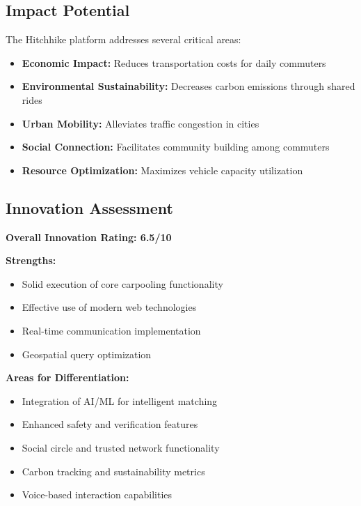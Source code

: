 \documentclass[12pt,a4paper]{article}
\begin{document}
\subsection{Impact Potential}

The Hitchhike platform addresses several critical areas:

\begin{itemize}
    \item \textbf{Economic Impact:} Reduces transportation costs for daily commuters
    \item \textbf{Environmental Sustainability:} Decreases carbon emissions through shared rides
    \item \textbf{Urban Mobility:} Alleviates traffic congestion in cities
    \item \textbf{Social Connection:} Facilitates community building among commuters
    \item \textbf{Resource Optimization:} Maximizes vehicle capacity utilization
\end{itemize}

\subsection{Innovation Assessment}

\textbf{Overall Innovation Rating: 6.5/10}

\textbf{Strengths:}
\begin{itemize}
    \item Solid execution of core carpooling functionality
    \item Effective use of modern web technologies
    \item Real-time communication implementation
    \item Geospatial query optimization
\end{itemize}

\textbf{Areas for Differentiation:}
\begin{itemize}
    \item Integration of AI/ML for intelligent matching
    \item Enhanced safety and verification features
    \item Social circle and trusted network functionality
    \item Carbon tracking and sustainability metrics
    \item Voice-based interaction capabilities
\end{itemize}
\end{document}
